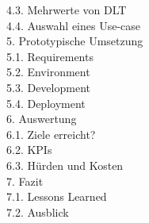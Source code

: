 \begin{small}
	\noindent\hspace*{10mm}%
	4.3. Mehrwerte von DLT\\
	\noindent\hspace*{10mm}%
	4.4. Auswahl eines Use-case\\
	5. Prototypische Umsetzung\\
	\noindent\hspace*{10mm}%
	5.1. Requirements\\
	\noindent\hspace*{10mm}%
	5.2. Environment\\
	\noindent\hspace*{10mm}%
	5.3. Development\\
	\noindent\hspace*{10mm}%
	5.4. Deployment\\
	6. Auswertung\\
	\noindent\hspace*{10mm}%
	6.1. Ziele erreicht?\\
	\noindent\hspace*{10mm}%
	6.2. KPIs\\
	\noindent\hspace*{10mm}%
	6.3. Hürden und Kosten\\
	7. Fazit\\
	\noindent\hspace*{10mm}%
	7.1. Lessons Learned\\
	\noindent\hspace*{10mm}%
	7.2. Ausblick\\
\end{small}

\newpage